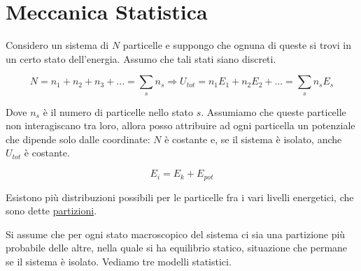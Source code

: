
\section{Meccanica Statistica}

Considero un sistema di $N$ particelle e suppongo che ognuna di queste si trovi in un certo stato dell'energia.
Assumo che tali stati siano discreti.

$$ N = n_1 + n_2 + n_3 + ... = \sum_s n_s \Rightarrow U_{tot} = n_1 E_1 + n_2 E_2 + ... = \sum_s n_s E_s $$

Dove $n_s$ è il numero di particelle nello stato $s$.
Assumiamo che queste particelle non interagiscano tra loro, allora posso attribuire ad ogni particella un potenziale che dipende solo dalle coordinate:
$N$ è costante e, se il sistema è isolato, anche $U_{tot}$ è costante.

$$ E_i = E_k + E_{pot} $$

Esistono più distribuzioni possibili per le particelle fra i vari livelli energetici, che sono dette \underline{partizioni}.

Si assume che per ogni stato macroscopico del sistema ci sia una partizione più probabile delle altre, nella quale si ha equilibrio statico,
situazione che permane se il sistema è isolato.
Vediamo tre modelli statistici.


